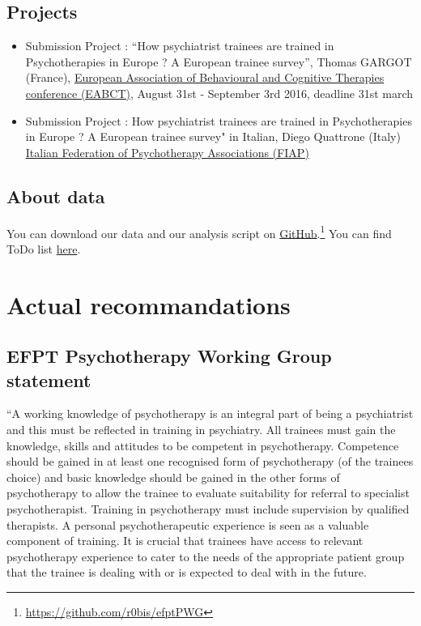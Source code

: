 \documentclass[]{tufte-handout}
\providecommand{\tightlist}{%
  \setlength{\itemsep}{0pt}\setlength{\parskip}{0pt}}
\begin{document}
\subsection{Projects}\label{projects}

\begin{itemize}
\tightlist
\item
  Submission Project : ``How psychiatrist trainees are trained in
  Psychotherapies in Europe ? A European trainee survey'', Thomas GARGOT
  (France), \href{http://eabct2016.org/}{European Association of
  Behavioural and Cognitive Therapies conference (EABCT)}, August 31st -
  September 3rd 2016, deadline 31st march
\item
  Submission Project : How psychiatrist trainees are trained in
  Psychotherapies in Europe ? A European trainee survey" in Italian,
  Diego Quattrone (Italy)
  \href{http://www.fiap.info/convegno2016/}{Italian Federation of
  Psychotherapy Associations (FIAP)}
\end{itemize}

\subsection{About data}\label{about-data}

You can download our data and our analysis script on
\href{https://github.com/r0bis/efptPWG}{GitHub}.\footnote{\url{https://github.com/r0bis/efptPWG}}
You can find ToDo list
\href{https://github.com/r0bis/efptPWG/blob/master/about-data/todolist.md}{here}.

\section{Actual recommandations}\label{actual-recommandations}

\subsection{EFPT Psychotherapy Working Group
statement}\label{efpt-psychotherapy-working-group-statement}

``A working knowledge of psychotherapy is an integral part of being a
psychiatrist and this must be reflected in training in psychiatry. All
trainees must gain the knowledge, skills and attitudes to be competent
in psychotherapy. Competence should be gained in at least one recognised
form of psychotherapy (of the trainees choice) and basic knowledge
should be gained in the other forms of psychotherapy to allow the
trainee to evaluate suitability for referral to specialist
psychotherapist. Training in psychotherapy must include supervision by
qualified therapists. A personal psychotherapeutic experience is seen as
a valuable component of training. It is crucial that trainees have
access to relevant psychotherapy experience to cater to the needs of the
appropriate patient group that the trainee is dealing with or is
expected to deal with in the future.
\end{document}
